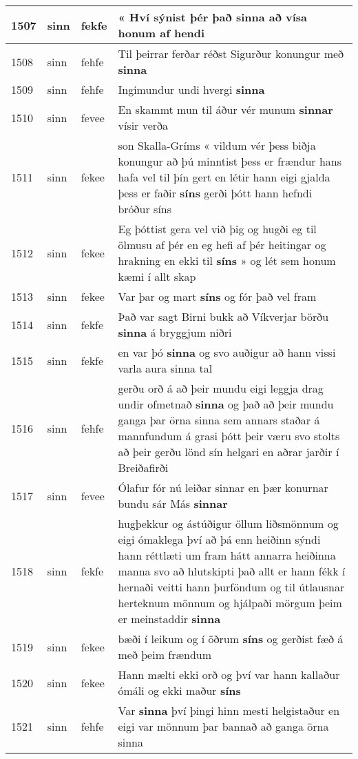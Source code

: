 \documentclass{article}
\begin{document}
\begin{longtable}{p{1cm}|p{1cm}|p{1cm}|p{13cm}}
\hline
1507&sinn&fekfe&« Hví sýnist þér það \textbf{sinna} að vísa honum af hendi\\
\hline
1508&sinn&fehfe&Til þeirrar ferðar réðst Sigurður konungur með \textbf{sinna} \\
\hline
1509&sinn&fehfe&Ingimundur undi hvergi \textbf{sinna} \\
\hline
1510&sinn&fevee&En skammt mun til áður vér munum \textbf{sinnar} vísir verða\\
\hline
1511&sinn&fekee&son Skalla-Gríms « vildum vér þess biðja konungur að þú minntist þess er frændur hans hafa vel til þín gert en létir hann eigi gjalda þess er faðir \textbf{síns} gerði þótt hann hefndi bróður síns\\
\hline
1512&sinn&fekee&Eg þóttist gera vel við þig og hugði eg til ölmusu af þér en eg hefi af þér heitingar og hrakning en ekki til \textbf{síns} » og lét sem honum kæmi í allt skap\\
\hline
1513&sinn&fekee&Var þar og mart \textbf{síns} og fór það vel fram\\
\hline
1514&sinn&fekfe&Það var sagt Birni bukk að Víkverjar börðu \textbf{sinna} á bryggjum niðri\\
\hline
1515&sinn&fekfe&en var þó \textbf{sinna} og svo auðigur að hann vissi varla aura sinna tal\\
\hline
1516&sinn&fehfe&gerðu orð á að þeir mundu eigi leggja drag undir ofmetnað \textbf{sinna} og það að þeir mundu ganga þar örna sinna sem annars staðar á mannfundum á grasi þótt þeir væru svo stolts að þeir gerðu lönd sín helgari en aðrar jarðir í Breiðafirði\\
\hline
1517&sinn&fevee&Ólafur fór nú leiðar sinnar en þær konurnar bundu sár Más \textbf{sinnar} \\
\hline
1518&sinn&fekfe&hugþekkur og ástúðigur öllum liðsmönnum og eigi ómaklega því að þá enn heiðinn sýndi hann réttlæti um fram hátt annarra heiðinna manna svo að hlutskipti það allt er hann fékk í hernaði veitti hann þurföndum og til útlausnar herteknum mönnum og hjálpaði mörgum þeim er meinstaddir \textbf{sinna} \\
\hline
1519&sinn&fekee&bæði í leikum og í öðrum \textbf{síns} og gerðist fæð á með þeim frændum\\
\hline
1520&sinn&fekee&Hann mælti ekki orð og því var hann kallaður ómáli og ekki maður \textbf{síns} \\
\hline
1521&sinn&fehfe&Var \textbf{sinna} því þingi hinn mesti helgistaður en eigi var mönnum þar bannað að ganga örna sinna\\

\end{longtable}
\end{document}
